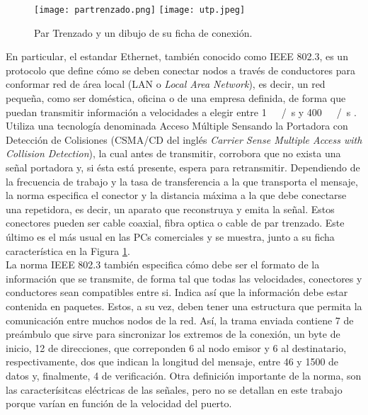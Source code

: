 \begin{figure}
	\centering
	\texttt{[image: partrenzado.png]}
	\texttt{[image: utp.jpeg]}
	\caption{Par Trenzado y un dibujo de su ficha de conexión.}
	\label{fig:utp}
\end{figure}

En particular, el estandar Ethernet, también conocido como IEEE 802.3, es un protocolo que define cómo se deben conectar nodos a través de conductores para conformar red de área local (LAN o {\it Local Area Network}), es decir, un red pequeña, como ser doméstica, oficina o de una empresa definida, de forma que puedan transmitir información a velocidades a elegir entre \SI{1}{\mega\bit\slash\second} y \SI{400}{\giga\bit\slash\second} \cite{Ethernet2018}. Utiliza una tecnología denominada Acceso Múltiple Sensando la Portadora con Detección de Colisiones (CSMA/CD del inglés {\it Carrier Sense Multiple Access with Collision Detection}), la cual antes de transmitir, corrobora que no exista una señal portadora y, si ésta está presente, espera para retransmitir. Dependiendo de la frecuencia de trabajo y la tasa de transferencia a la que transporta el mensaje, la norma especifica el conector y la distancia máxima a la que debe conectarse una repetidora, es decir, un aparato que reconstruya y emita la señal. Estos conectores pueden ser cable coaxial, fibra optica o cable de par trenzado. Este último es el más usual en las PCs comerciales y se muestra, junto a su ficha característica en la Figura \ref{fig:utp}.\\

La norma IEEE 802.3 también especifica cómo debe ser el formato de la información que se transmite, de forma tal que todas las velocidades, conectores y conductores sean compatibles entre si. Indica así que la información debe estar contenida en paquetes. Estos, a su vez, deben tener una estructura que permita la comunicación entre muchos nodos de la red. Así, la trama enviada contiene \SI{7}{\byte} de preámbulo que sirve para sincronizar los extremos de la conexión, un byte de inicio, 12 de direcciones, que correponden 6 al nodo emisor y 6 al destinatario, respectivamente, dos que indican la longitud del mensaje, entre 46 y \SI{1500}{\byte} de datos y, finalmente, 4 de verificación. Otra definición importante de la norma, son las caracterísitcas eléctricas de las señales, pero no se detallan en este trabajo porque varían en función de la velocidad del puerto.\\

